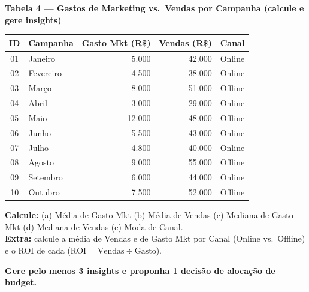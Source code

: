 \begin{BoardBox}
\textbf{Tabela 4 — Gastos de Marketing vs.\ Vendas por Campanha (calcule e gere insights)}

\medskip
\begin{tabular}{|c|l|r|r|l|}
\hline
\textbf{ID} & \textbf{Campanha} & \textbf{Gasto Mkt (R\$)} & \textbf{Vendas (R\$)} & \textbf{Canal} \\
\hline
01 & Janeiro   &  5.000 & 42.000 & Online  \\
02 & Fevereiro &  4.500 & 38.000 & Online  \\
03 & Março     &  8.000 & 51.000 & Offline \\
04 & Abril     &  3.000 & 29.000 & Online  \\
05 & Maio      & 12.000 & 48.000 & Offline \\
06 & Junho     &  5.500 & 43.000 & Online  \\
07 & Julho     &  4.800 & 40.000 & Online  \\
08 & Agosto    &  9.000 & 55.000 & Offline \\
09 & Setembro  &  6.000 & 44.000 & Online  \\
10 & Outubro   &  7.500 & 52.000 & Offline \\
\hline
\end{tabular}

\smallskip
\textbf{Calcule:}
(a) Média de Gasto Mkt \quad
(b) Média de Vendas \quad
(c) Mediana de Gasto Mkt \quad
(d) Mediana de Vendas \quad
(e) Moda de Canal. \\
\textbf{Extra:} calcule a média de Vendas e de Gasto Mkt por Canal
(Online vs.\ Offline) e o ROI de cada ($\text{ROI} = \text{Vendas} \div \text{Gasto}$).

\smallskip
\textbf{Gere pelo menos 3 insights e proponha 1 decisão de alocação de budget.}


\end{BoardBox}
